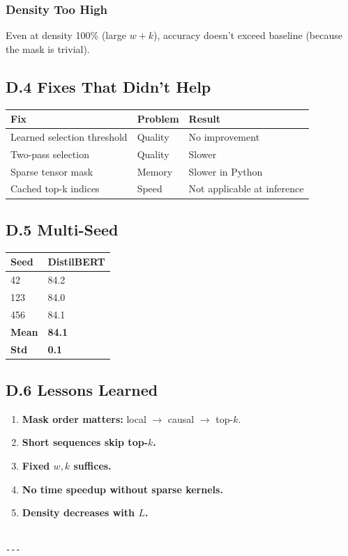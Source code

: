 \subsubsection{Density Too High}

Even at density 100\% (large $w + k$), accuracy doesn't exceed baseline 
(because the mask is trivial).

\subsection{D.4 Fixes That Didn't Help}

\begin{table}[H]
\centering
\small
\begin{tabular}{lll}
\toprule
\textbf{Fix} & \textbf{Problem} & \textbf{Result} \\
\midrule
Learned selection threshold & Quality & No improvement \\
Two-pass selection & Quality & Slower \\
Sparse tensor mask & Memory & Slower in Python \\
Cached top-k indices & Speed & Not applicable at inference \\
\bottomrule
\end{tabular}
\end{table}

\subsection{D.5 Multi-Seed}

\begin{table}[H]
\centering
\small
\begin{tabular}{ll}
\toprule
\textbf{Seed} & \textbf{DistilBERT} \\
\midrule
42 & 84.2 \\
123 & 84.0 \\
456 & 84.1 \\
\textbf{Mean} & \textbf{84.1} \\
\textbf{Std} & \textbf{0.1} \\
\bottomrule
\end{tabular}
\end{table}

\subsection{D.6 Lessons Learned}

\begin{enumerate}
\item \textbf{Mask order matters:} local $\to$ causal $\to$ top-$k$.
\item \textbf{Short sequences skip top-$k$.}
\item \textbf{Fixed $w, k$ suffices.}
\item \textbf{No time speedup without sparse kernels.}
\item \textbf{Density decreases with $L$.}
\end{enumerate}
\begin{lstlisting}

---
\end{lstlisting}


